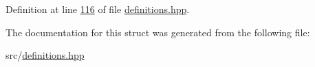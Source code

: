 Definition at line \hyperlink{definitions_8hpp_source_l00116}{116} of file \hyperlink{definitions_8hpp_source}{definitions.\+hpp}.



The documentation for this struct was generated from the following file\+:\begin{DoxyCompactItemize}
\item 
src/\hyperlink{definitions_8hpp}{definitions.\+hpp}\end{DoxyCompactItemize}
